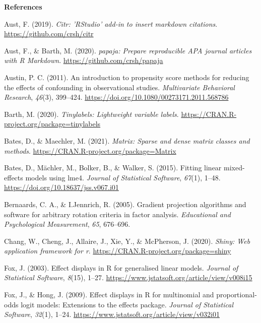 \documentclass[
  english,
  man, noextraspace]{apa7}
\begin{document}
\begin{appendix}
\newpage

\noindent  \textbf{References}

\begingroup
\setlength{\parindent}{-0.5in}
\setlength{\leftskip}{0.5in}

\hypertarget{refs}{}
\leavevmode\hypertarget{ref-R-citr}{}%
Aust, F. (2019). \emph{Citr: 'RStudio' add-in to insert markdown
citations}. \url{https://github.com/crsh/citr}

\leavevmode\hypertarget{ref-R-papaja}{}%
Aust, F., \& Barth, M. (2020). \emph{papaja: Prepare reproducible APA
journal articles with R Markdown}. \url{https://github.com/crsh/papaja}

\leavevmode\hypertarget{ref-austinIntroductionPropensityScore2011}{}%
Austin, P. C. (2011). An introduction to propensity score methods for
reducing the effects of confounding in observational studies.
\emph{Multivariate Behavioral Research}, \emph{46}(3), 399--424.
\url{https://doi.org/10.1080/00273171.2011.568786}

\leavevmode\hypertarget{ref-R-tinylabels}{}%
Barth, M. (2020). \emph{Tinylabels: Lightweight variable labels}.
\url{https://CRAN.R-project.org/package=tinylabels}

\leavevmode\hypertarget{ref-R-Matrix}{}%
Bates, D., \& Maechler, M. (2021). \emph{Matrix: Sparse and dense matrix
classes and methods}. \url{https://CRAN.R-project.org/package=Matrix}

\leavevmode\hypertarget{ref-R-lme4}{}%
Bates, D., Mächler, M., Bolker, B., \& Walker, S. (2015). Fitting linear
mixed-effects models using lme4. \emph{Journal of Statistical Software},
\emph{67}(1), 1--48. \url{https://doi.org/10.18637/jss.v067.i01}

\leavevmode\hypertarget{ref-R-GPArotation}{}%
Bernaards, C. A., \& I.Jennrich, R. (2005). Gradient projection
algorithms and software for arbitrary rotation criteria in factor
analysis. \emph{Educational and Psychological Measurement}, \emph{65},
676--696.

\leavevmode\hypertarget{ref-R-shiny}{}%
Chang, W., Cheng, J., Allaire, J., Xie, Y., \& McPherson, J. (2020).
\emph{Shiny: Web application framework for r}.
\url{https://CRAN.R-project.org/package=shiny}

\leavevmode\hypertarget{ref-R-effects_b}{}%
Fox, J. (2003). Effect displays in R for generalised linear models.
\emph{Journal of Statistical Software}, \emph{8}(15), 1--27.
\url{https://www.jstatsoft.org/article/view/v008i15}

\leavevmode\hypertarget{ref-R-effects_c}{}%
Fox, J., \& Hong, J. (2009). Effect displays in R for multinomial and
proportional-odds logit models: Extensions to the effects package.
\emph{Journal of Statistical Software}, \emph{32}(1), 1--24.
\url{https://www.jstatsoft.org/article/view/v032i01}


\end{appendix}
\end{document}
